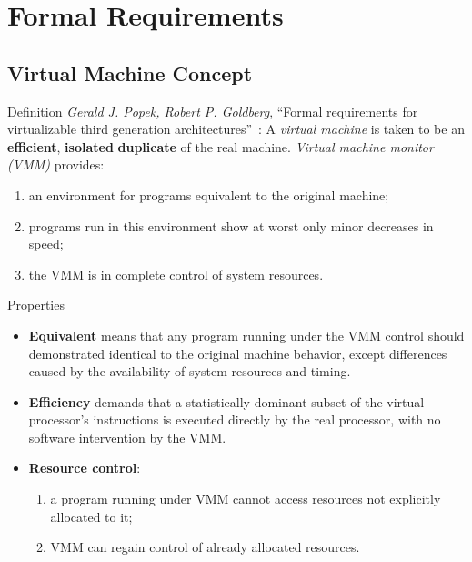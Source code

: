 \section{Formal Requirements}

\subsection{Virtual Machine Concept}

\begin{frame}{Definition}
\textit{Gerald J. Popek, Robert P. Goldberg}, ``Formal requirements for
virtualizable third generation
architectures''~\cite{popek-goldberg-vm-requirements}:
\vfill\pause
A \textit{virtual machine} is taken to be an \textbf{efficient},
\textbf{isolated} \textbf{duplicate} of the real machine.
\vfill\pause
\textit{Virtual machine monitor (VMM)} provides:
\begin{enumerate}
\item an environment for programs equivalent to the original machine;\pause
\item programs run in this environment show at worst only minor decreases in
  speed;\pause
\item the VMM is in complete control of system resources.
\end{enumerate}
\end{frame}

\begin{frame}{Properties}
\begin{itemize}
\item \textbf{Equivalent} means that any program running under the
  VMM control should demonstrated identical to the original machine behavior,
  except differences caused by the availability of system resources and
  timing.\pause
\item \textbf{Efficiency} demands that a statistically dominant subset of the
  virtual processor's instructions is executed directly by the real processor,
  with no software intervention by the VMM.\pause
\item \textbf{Resource control}:
  \begin{enumerate}
  \item a program running under VMM cannot access resources not explicitly
    allocated to it;
  \item VMM can regain control of already allocated resources.
  \end{enumerate}
\end{itemize}
\end{frame}

